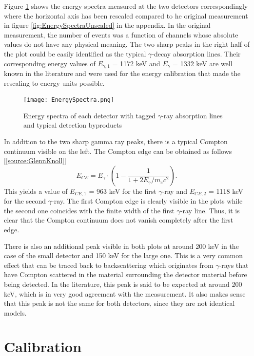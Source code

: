 \documentclass[a4paper,parskip,11pt, DIV12]{scrreprt}
\begin{document}
		Figure \ref{fig:EnergySpectra} shows the energy spectra measured at the two detectors correspondingly where the horizontal axis has been rescaled compared to he original measurement in figure \ref{fig:EnergySpectraUnscaled} in the appendix. In the original measurement, the number of events was a function of channels whose absolute values do not have any physical meaning. The two sharp peaks in the right half of the plot could be easily identified as the typical $\gamma$-decay absorption lines. Their corresponding energy values of $E_{\gamma,1}$ = 1172 keV and $E_{\gamma}$ = 1332 keV are well known in the literature and were used for the energy calibration that made the rescaling to energy units possible.	
		\begin{figure}[H]
\centering
\texttt{[image: EnergySpectra.png]}
\caption[EnergySpectra]{Energy spectra of each detector with tagged $\gamma$-ray absorption lines and typical detection byproducts}
\label{fig:EnergySpectra}
	\end{figure}	
		In addition to the two sharp gamma ray peaks, there is a typical Compton continuum visible on the left. The Compton edge can be obtained as follows [\ref{source:GlennKnoll}]
	\begin{equation}
E_{CE} = E_{\gamma} \cdot \left(1 - \frac{1}{1+2 E_{\gamma}/m_ec^2} \right).
\end{equation}
		This yields a value of $E_{CE,1}$ = 963 keV for the first $\gamma$-ray and $E_{CE,2}$ = 1118 keV for the second $\gamma$-ray. The first Compton edge is clearly visible in the plots while the second one coincides with the finite width of the first $\gamma$-ray line. Thus, it is clear that the Compton continuum does not vanish completely after the first edge.

		There is also an additional peak visible in both plots at around 200 keV in the case of the small detector and 150 keV for the large one. This is a very common effect that can be traced back to backscattering which originates from $\gamma$-rays that have Compton scattered in the material surrounding the detector material before being detected. In the literature, this peak is said to be expected at around 200 keV, which is in very good agreement with the measurement. It also makes sense that this peak is not the same for both detectors, since they are not identical models.


\chapter{Calibration}
\end{document}
